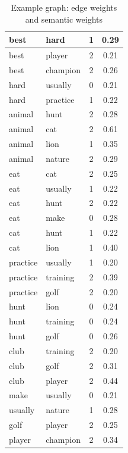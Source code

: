 \documentclass[a4paper, 12pt, oneside]{Thesis} %
\begin{document}
\begin{table}[th]
\centering
 \begin{tabular}{| p{6cm} | p{6cm} | c | c |}
 \hline
 best &  hard &  1 &  0.29 \\ \hline
 best &  player &  2 &  0.21 \\ \hline
 best &  champion &  2 &  0.26 \\ \hline
 hard &  usually &  0 &  0.21 \\ \hline
 hard &  practice &  1 &  0.22 \\ \hline
 animal &  hunt &  2 &  0.28 \\ \hline
 animal &  cat &  2 &  0.61 \\ \hline
 animal &  lion &  1 &  0.35 \\ \hline
 animal &  nature &  2 &  0.29 \\ \hline
 eat &  cat &  2 &  0.25 \\ \hline
 eat &  usually &  1 &  0.22 \\ \hline
 eat &  hunt &  2 &  0.22 \\ \hline
 eat &  make &  0 &  0.28 \\ \hline
 cat &  hunt &  1 &  0.22 \\ \hline
 cat &  lion &  1 &  0.40 \\ \hline
 practice &  usually &  1 &  0.20 \\ \hline
 practice &  training &  2 &  0.39 \\ \hline
 practice &  golf &  2 &  0.20 \\ \hline
 hunt &  lion &  0 &  0.24 \\ \hline
 hunt &  training &  0 &  0.24 \\ \hline
 hunt &  golf &  0 &  0.26 \\ \hline
 club &  training &  2 &  0.20 \\ \hline
 club &  golf &  2 &  0.31 \\ \hline
 club &  player &  2 &  0.44 \\ \hline
 make &  usually &  0 &  0.21 \\ \hline
 usually &  nature &  1 &  0.28 \\ \hline
 golf &  player &  2 &  0.25 \\ \hline
 player &  champion &  2 &  0.34 \\ \hline
\end{tabular}
\caption{Example graph: edge weights and semantic weights}
\label{tab:edgeweights}
\end{table}
\end{document}
